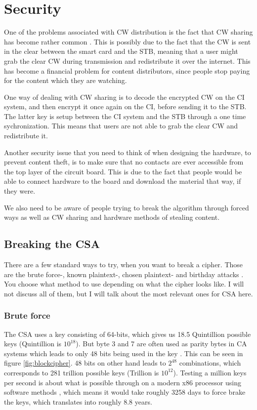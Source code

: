 \section{Security}
One of the problems associated with CW distribution is the fact that CW 
sharing has become rather common \citep{Farncombe}. This is possibly 
due to the fact that the CW is sent in the clear between the smart card 
and the STB, meaning that a user might grab the clear CW during 
transmission and redistribute it over the internet. This has become a 
financial problem for content distributors, since people stop paying 
for the content which they are watching.

One way of dealing with CW sharing is to decode the encrypted CW on the 
CI system, and then encrypt it once again on the CI, before sending it 
to the STB. The latter key is setup between the CI system and the STB  
through a one time sychronization. This means that users are not able 
to grab the clear CW and redistribute it. \citep[pp. 12--13]{HIS:2011}

Another security issue that you need to think of when designing the 
hardware, to prevent content theft, is to make sure that no contacts 
are ever accessible from the top layer of the circuit board. This is 
due to the fact that people would be able to connect hardware to the 
board and download the material that way, if they were. 

We also need to be aware of people trying to break the algorithm 
through forced ways as well as CW sharing and hardware methods of 
stealing content.

\subsection{Breaking the CSA}
There are a few standard ways to try, when you want to break a cipher. 
Those are the brute force-, known plaintext-, chosen plaintext- and 
birthday attacks \citep[pp. 31-34]{Schneier:2003}. You choose what 
method to use depending on what the cipher looks like. I will not 
discuss all of them, but I will talk about the most relevant ones for 
CSA here.

\subsubsection{Brute force}
The CSA uses a key consisting of 64-bits, which gives us 18.5 
Quintillion possible keys (Quintillion is $10^{18}$). But byte 3 and 7 
are often used as parity bytes in CA systems which leads to only 48 
bits being used in the key \citep{Breaking:2012}. This can be seen in 
figure \ref{fig:blockcipher}. 48 bits on other hand leads to $2^{48}$ 
combinations, which corresponds to 281 trillion possible keys (Trillion 
is $10^{12}$). Testing a million keys per second is about what is 
possible through on a modern x86 processor using software methods
, which means it would take 
roughly 3258 days to force brake the keys, which translates into 
roughly 8.8 years.

